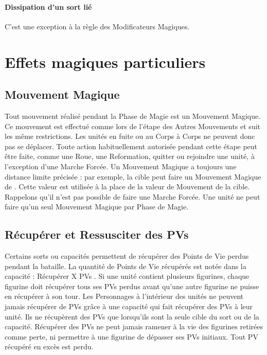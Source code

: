 \paragraph{Dissipation d'un sort lié}

 C'est une exception à la règle des Modificateurs Magiques.

\newpage
\section{Effets magiques particuliers}

\subsection{Mouvement Magique}

Tout mouvement réalisé pendant la Phase de Magie est un Mouvement Magique. Ce mouvement est effectué comme lors de l'étape des Autres Mouvements et suit les même restrictions. Les unités en fuite ou au Corps à Corps ne peuvent donc pas se déplacer. Toute action habituellement autorisée pendant cette étape peut être faite, comme une Roue, une Reformation, quitter ou rejoindre une unité, à l'exception d'une Marche Forcée. Un Mouvement Magique a toujours une distance limite précisée : par exemple, \og la cible peut faire un Mouvement Magique de  \fg{}. Cette valeur est utilisée à la place de la valeur de Mouvement de la cible. Rappelons qu'il n'est pas possible de faire une Marche Forcée. Une unité ne peut faire qu'un seul Mouvement Magique par Phase de Magie.

\subsection{Récupérer et Ressusciter des PVs}

Certains sorts ou capacités permettent de récupérer des Points de Vie perdus pendant la bataille. La quantité de Points de Vie récupérés est notée dans la capacité  : \og Récupérer X PVs \fg{}. Si une unité contient plusieurs figurines, chaque figurine doit récupérer tous ses PVs perdus avant qu'une autre figurine ne puisse en récupérer à son tour. Les Personnages à l'intérieur des unités ne peuvent jamais récupérer de PVs grâce à une capacité qui fait récupérer des PVs à leur unité. Ils ne récupèrent des PVs que lorsqu'ils sont la seule cible du sort ou de la capacité. Récupérer des PVs ne peut jamais ramener à la vie des figurines retirées comme perte, ni permettre à une figurine de dépasser ses PVs initiaux. Tout PV récupéré en excès est perdu.

